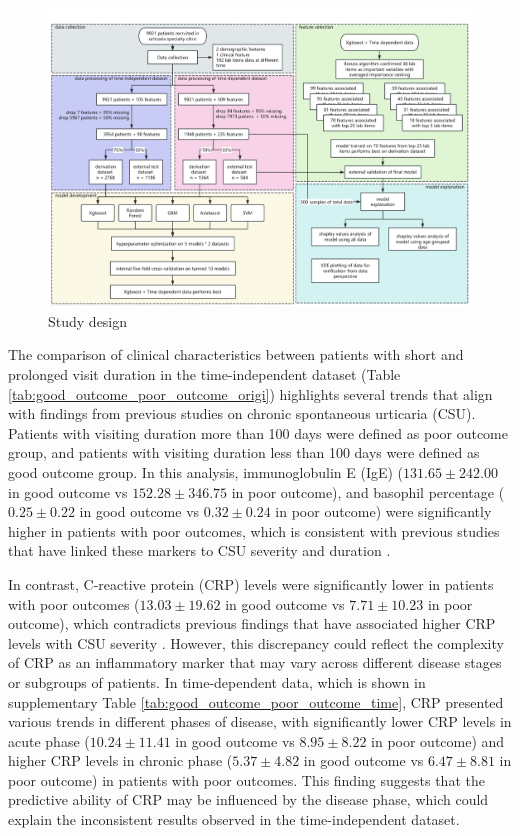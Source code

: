 \documentclass[final,3p,times,authoryear]{elsarticle}
\begin{document}
\begin{figure}[t]
    \centering
    \includegraphics[width=0.8\linewidth]{figures/protocol.png}
    \caption{Study design}\label{protocol}
\end{figure}

The comparison of clinical characteristics between patients with short and prolonged visit duration in the time-independent dataset (Table \ref{tab:good_outcome_poor_outcome_origi}) highlights several trends that align with findings from previous studies on chronic spontaneous urticaria (CSU).
Patients with visiting duration more than 100 days were defined as poor outcome group, and patients with visiting duration less than 100 days were defined as good outcome group. In this analysis, immunoglobulin E (IgE) ($131.65 \pm 242.00$ in good outcome vs $152.28 \pm 346.75$ in poor outcome), and basophil percentage ($0.25 \pm 0.22$ in good outcome vs $0.32 \pm 0.24$ in poor outcome) were significantly higher in patients with poor outcomes, which is consistent with previous studies that have linked these markers to CSU severity and duration \citep{SanchezBorges2017Factors,Rabelo-Filardi2013Parameters}. 

In contrast, C-reactive protein (CRP) levels were significantly lower in patients with poor outcomes ($13.03 \pm 19.62$ in good outcome vs $7.71 \pm 10.23$ in poor outcome), which contradicts previous findings that have associated higher CRP levels with CSU severity \citep{Rabelo-Filardi2013Parameters}. However, this discrepancy could reflect the complexity of CRP as an inflammatory marker that may vary across different disease stages or subgroups of patients. In time-dependent data, which is shown in supplementary Table \ref{tab:good_outcome_poor_outcome_time}, CRP presented various trends in different phases of disease, with significantly lower CRP levels in acute phase ($10.24 \pm 11.41$ in good outcome vs $8.95 \pm 8.22$ in poor outcome) and higher CRP levels in chronic phase ($5.37 \pm 4.82$ in good outcome vs $6.47 \pm 8.81$ in poor outcome) in patients with poor outcomes. This finding suggests that the predictive ability of CRP may be influenced by the disease phase, which could explain the inconsistent results observed in the time-independent dataset.
\end{document}
